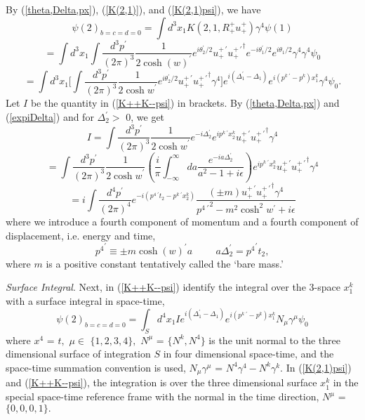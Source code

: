 \documentclass[a4paper,12pt]{article}
\begin{document}
	By (\ref{theta,Delta,px}), (\ref{K(2,1)}), and (\ref{K(2,1)psi}), we have
$$ \psi(2)_{b=c=d=0} = \int d^3x_{1}K(2,1,R_{+}^{+}u_{+}^{+}) \gamma^{4} \psi(1)$$ $$ =  \int d^3x_{1}\int \frac{d^3 p^{\prime} }{(2 \pi)^3} \frac{1}{2 {\cosh{(w)}}^{\prime}}e^{i \theta_{2}^{\prime}/2}  u_{+}^{+ \, \prime} {u_{+}^{+ \, \prime }}^{\dagger} e^{ -i \theta_{1}^{\prime}/2}e^{i \theta_{1} / 2} \gamma^{4} \gamma^{4} \psi_{0}
$$
\begin{equation}	\label{K++K--psi}
= \int d^3 x_{1}\lbrack \int \frac{d^3 p^{\prime} }{(2 \pi)^3} \frac{1}{2 {\cosh{w}}^{\prime}}e^{i \theta_{2}^{\prime}/2}  u_{+}^{+ \, \prime} {u_{+}^{+ \, \prime }}^{\dagger} \gamma^{4}\rbrack e^{ i (\Delta_{1}^{\prime}- \Delta_{1})} e^{i (p^{k \; \prime} - p^{k})x_{1}^{k}}  \gamma^{4} \psi_{0}.
\end{equation}
Let $I$ be the quantity in (\ref{K++K--psi}) in brackets. By (\ref{theta,Delta,px}) and (\ref{expiDelta}) and for $\Delta_{2}^{\prime} >$ 0, we get
$$ I = \int \frac{d^3 p^{\prime} }{(2 \pi)^3} \frac{1}{2 {\cosh{w}}^{\prime}} e^{-i\Delta_{2}^{\prime}} e^{ip^{k \; \prime}x_{2}^{k}} u_{+}^{+ \, \prime} {u_{+}^{+ \, \prime }}^{\dagger} \gamma^{4} 
$$
$$= \int \frac{d^3 p^{\prime} }{(2 \pi)^3} \frac{1}{2 {\cosh{w}}^{\prime}}  ( \frac{i}{ \pi}  \int_{-\infty}^{\infty} da \frac{e^{-ia\Delta_{2}^{\prime}}}{a^2-1+i\epsilon}) e^{ip^{k \; \prime}x_{2}^{k}} u_{+}^{+ \, \prime} {u_{+}^{+ \, \prime }}^{\dagger} \gamma^{4} 
$$
\begin{equation} \label{QED}
=  i  \int \frac{d^4 p^{\prime} }{(2 \pi)^4} e^{-i(p^{4 \; \prime}t_{2} - p^{k \; \prime}x_{2}^{k})}  \frac{ (\pm m) u_{+}^{+ \, \prime} {u_{+}^{+ \, \prime }}^{\dagger} \gamma^{4}}{{p^{4 \; \prime}}^2- m^{2} \cosh^{2}{w}^{\prime} + i\epsilon} 
\end{equation}
where we introduce a fourth component of momentum and a fourth component of displacement, i.e. energy and time,
\begin{equation}	\label{p4t}
{p^{4}}^{\prime} \equiv \pm m {\cosh{(w)}}^{\prime} a   \hspace{1cm}  a \Delta_{2}^{\prime} = {p^{4}}^{\prime} t_{2} , 
\end{equation}
where $m$ is a positive constant tentatively called the `bare mass.' 

	{\textit{Surface Integral}}. Next, in (\ref{K++K--psi}) identify the integral over the 3-space $x_{1}^{k}$ with a surface integral in space-time,
\begin{equation}	\label{K++K--psi1}
\psi(2)_{b=c=d=0} = \int_{S} d^4 x_{1}I e^{ i (\Delta_{1}^{\prime}- \Delta_{1})} e^{i (p^{k \; \prime} - p^{k})x_{1}^{k}} N_{\mu} \gamma^{\mu} \psi_{0}
\end{equation}
where $x^{4}$ = $t,$ $\mu \in$ $\{1,2,3,4\},$ $N^{\mu}$ = $\{N^{k},N^{4}\}$ is the unit normal to the three dimensional surface of integration $S$ in four dimensional space-time, and the space-time summation convention is used, $N_{\mu} \gamma^{\mu}$ = $N^{4} \gamma^{4} - N^{k} \gamma^{k}.$ In (\ref{K(2,1)psi}) and (\ref{K++K--psi}), the integration is over the three dimensional surface $x_{1}^{k}$ in the special space-time reference frame with the normal in the time direction,  $N^{\mu}$ = $\{0,0,0,1\}.$ 
\end{document}
